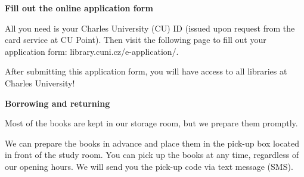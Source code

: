 

\ifdefined\ikonka\else%
\newcommand\ikonka[1]{\bigskip\bgroup\Large #1\egroup\par}
\renewcommand\section[2][]{%
  \bgroup\large \textbf{#2}\egroup\par%
}
\fi
\ikonka{\faPencil}
\section{Fill out the online application form}


All you need is your Charles University (CU) ID (issued upon request from  
the card service at CU Point). Then visit the following page
to fill out your application form:
library.cuni.cz/e-application/.

After submitting this application form, you will have access to all libraries at Charles University!

\ikonka{\faBook}
\section{Borrowing and returning }

Most of the books are kept in our storage room, but we prepare them promptly.

We can prepare the books in advance and place them in the pick-up box located
in front of the study room. You can pick up the books at any time, regardless
of our opening hours. We will send you the pick-up code via text message (SMS).


